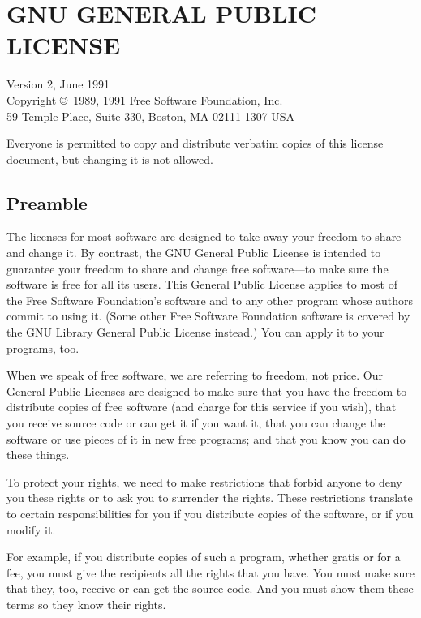 
\small
\section{GNU GENERAL PUBLIC LICENSE}
\label{sec:gpl}

Version 2, June 1991\\

\noindent
 Copyright \copyright\ 1989, 1991 Free Software Foundation, Inc.\\
     59 Temple Place, Suite 330, Boston, MA  02111-1307  USA

\noindent
 Everyone is permitted to copy and distribute verbatim copies
 of this license document, but changing it is not allowed.


\subsection*{Preamble}

The licenses for most software are designed to take away your freedom to
share and change it.  By contrast, the GNU General Public License is intended
to guarantee your freedom to share and change free software---to make sure
the software is free for all its users.  This General Public License applies
to most of the Free Software Foundation's software and to any other program
whose authors commit to using it.  (Some other Free Software Foundation
software is covered by the GNU Library General Public License instead.)  You
can apply it to your programs, too.

When we speak of free software, we are referring to freedom, not price.  Our
General Public Licenses are designed to make sure that you have the freedom
to distribute copies of free software (and charge for this service if you
wish), that you receive source code or can get it if you want it, that you
can change the software or use pieces of it in new free programs; and that
you know you can do these things.

To protect your rights, we need to make restrictions that forbid anyone to
deny you these rights or to ask you to surrender the rights.  These
restrictions translate to certain responsibilities for you if you distribute
copies of the software, or if you modify it.

For example, if you distribute copies of such a program, whether gratis or
for a fee, you must give the recipients all the rights that you have.  You
must make sure that they, too, receive or can get the source code.  And you
must show them these terms so they know their rights.

